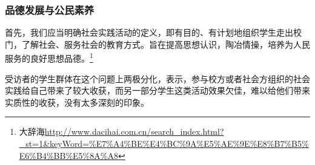 \documentclass[12pt,UTF8]{ctexart}
\begin{document}
\subsubsection {品德发展与公民素养}
\par {
	
	首先，我们应当明确社会实践活动的定义，即有目的、有计划地组织学生走出校门，了解社会、服务社会的教育方式。旨在提高思想认识，陶冶情操，培养为人民服务的良好思想品德。\footnote{大辞海\url{http://www.dacihai.com.cn/search_index.html?_st=1&keyWord=\%E7\%A4\%BE\%E4\%BC\%9A\%E5\%AE\%9E\%E8\%B7\%B5\%E6\%B4\%BB\%E5\%8A\%A8}}
}
\par {
	
	受访者的学生群体在这个问题上两极分化，表示，参与校方或者社会方组织的社会实践给自己带来了较大收获，而另一部分学生这类活动效果欠佳，难以给他们带来实质性的收获，没有太多深刻的印象。
}
\end{document}

